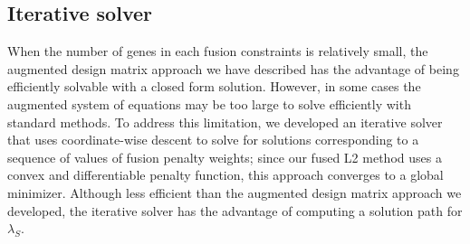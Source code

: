 \documentclass[11pt]{article}
\begin{document}


\subsection{Iterative solver}

When the number of genes in each fusion constraints is relatively small, the augmented design matrix approach we have described has the advantage of being efficiently solvable with a closed form solution. However, in some cases the augmented system of equations may be too large to solve efficiently with standard methods. To address this limitation, we developed an iterative solver that uses coordinate-wise descent to solve for solutions corresponding to a sequence of values of fusion penalty weights; since our fused L2 method uses a convex and differentiable penalty function, this approach converges to a global minimizer. Although less efficient than the augmented design matrix approach we developed, the iterative solver has the advantage of computing a solution path for $\lambda_S$.
\end{document}
